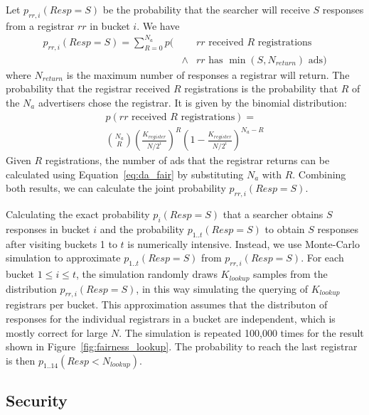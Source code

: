 Let $p_{rr,i}(Resp=S)$ be the probability that the searcher will receive $S$ responses from a registrar $rr$ in bucket $i$. We have
\begin{eqnarray*}
p_{rr,i}(Resp=S) =\sum_{R=0}^{N_a}{} p(  & & \mbox{$rr$ received $R$ registrations}\\
                        & \wedge &  \mbox{$rr$ has $\min(S,N_{return})$ ads})
\end{eqnarray*}
where $N_{return}$ is the maximum number of responses a registrar will return. The probability that the registrar received $R$ registrations is the probability that $R$ of the $N_a$ advertisers chose the registrar. It is given by the binomial distribution:
\begin{eqnarray*}
p(\mbox{$rr$ received $R$ registrations}) = \\
\binom{N_a}{R} \left( \frac{K_{register}}{N/2^i} \right)^R \left(1 - \frac{K_{register}}{N/2^i} \right)^{N_a-R}
\end{eqnarray*}
Given $R$ registrations, the number of ads that the registrar returns can be calculated using Equation~\ref{eq:da_fair} by substituting $N_a$ with $R$. Combining both results, we can calculate the joint probability $p_{rr,i}(Resp=S)$.

Calculating the exact probability $p_{i}(Resp=S)$ that a searcher obtains $S$ responses in bucket $i$ and the probability $p_{1..t}(Resp=S)$ to obtain $S$ responses after visiting buckets 1 to $t$ is numerically intensive.
Instead, we use Monte-Carlo simulation to approximate $p_{1..t}(Resp=S)$ from $p_{rr,i}(Resp=S)$. For each bucket $1\le i \le t$, the simulation randomly draws $K_{lookup}$ samples from the distribution $p_{rr,i}(Resp=S)$, in this way simulating the querying of $K_{lookup}$ registrars per bucket. This approximation assumes that the distributon of responses for the individual registrars in a bucket are independent, which is mostly correct for large $N$. The simulation is repeated 100,000 times for the result shown in Figure~\ref{fig:fairness_lookup}.
The probability to reach the last registrar is then $p_{1..14}(Resp< N_{lookup})$.


\subsection{Security}

